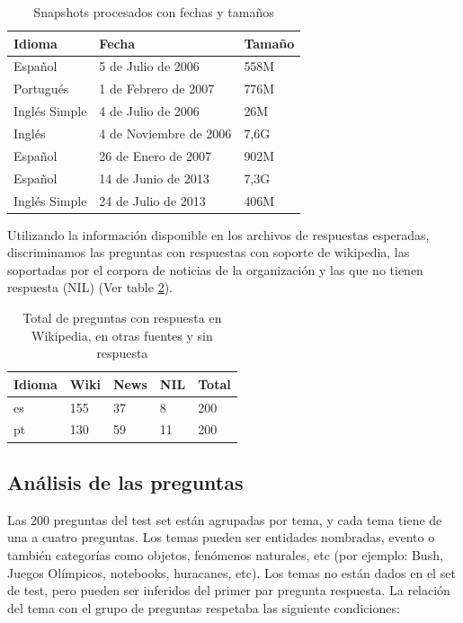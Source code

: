 \begin{center}
\begin{table}
\begin{tabular}{ | l | l | l |}
    \hline
    Idioma & Fecha & Tamaño  \\ \hline
    Español & 5 de Julio de 2006 & 558M  \\ \hline
    Portugués & 1 de Febrero de 2007 & 776M   \\ \hline
    Inglés Simple & 4 de Julio de 2006 & 26M  \\ \hline
    Inglés & 4 de Noviembre de 2006 & 7,6G    \\ \hline
    Español & 26 de Enero de 2007 & 902M    \\ \hline
    Español & 14 de Junio de 2013 & 7,3G    \\ \hline
    Inglés Simple & 24 de Julio de 2013 & 406M    \\ \hline
\end{tabular}
\caption{Snapshots procesados con fechas y tamaños}
\label{table:wikipedias}
\end{table}
\end{center}

Utilizando la información disponible en los archivos de respuestas esperadas, discriminamos las preguntas con respuestas con soporte de wikipedia, las soportadas por el corpora de noticias de la organización y las que no tienen respuesta (NIL) (Ver table \ref{table:preguntas-por-respuesta}).

\begin{center}
\begin{table}
\begin{tabular}{| l | l | l | l | l |}
\hline
Idioma & Wiki & News & NIL & Total \\ \hline
es & 155 & 37 & 8 & 200 \\ \hline
pt & 130 & 59 & 11 & 200 \\ \hline
\end{tabular}
\caption{Total de preguntas con respuesta en Wikipedia, en otras fuentes y sin respuesta}
\label{table:preguntas-por-respuesta}
\end{table}
\end{center}


\subsection{Análisis de las preguntas}

Las 200 preguntas del test set están agrupadas por tema, y cada tema tiene de una a cuatro preguntas. Los temas pueden ser entidades nombradas, evento o también categorías como objetos, fenómenos naturales, etc (por ejemplo: Bush, Juegos Olímpicos, notebooks, huracanes, etc).
Los temas no están dados en el set de test, pero pueden ser inferidos del primer par pregunta respuesta. La relación del tema con el grupo de preguntas respetaba las siguiente condiciones:

